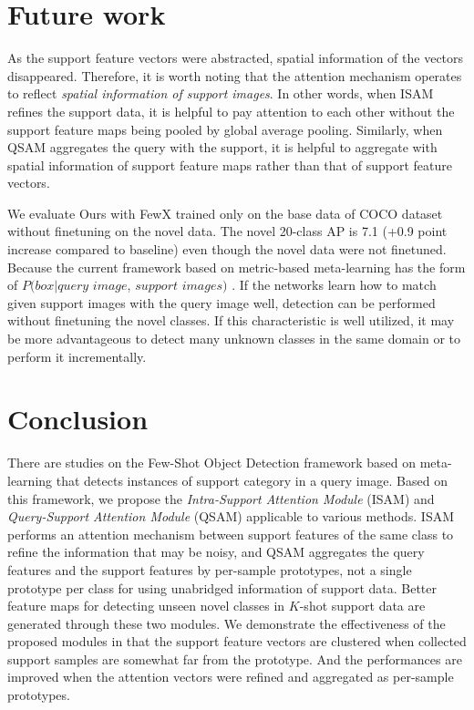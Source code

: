 \documentclass[10pt,twocolumn,letterpaper]{article}
\begin{document}
\section{Future work}
\label{sec:future work}
\quad As the support feature vectors were abstracted, spatial information of the vectors disappeared. Therefore, it is worth noting that the attention mechanism operates to reflect \textit{spatial information of support images}. In other words, when ISAM refines the support data, it is helpful to pay attention to each other without the support feature maps being pooled by global average pooling.
Similarly, when QSAM aggregates the query with the support, it is helpful to aggregate with spatial information of support feature maps rather than that of support feature vectors.

\vspace{+0.15cm}
\quad We evaluate Ours with FewX trained only on the base data of COCO dataset without finetuning on the novel data. The novel 20-class AP is 7.1 (+0.9 point increase compared to baseline) even though the novel data were not finetuned. Because the current framework based on metric-based meta-learning has the form of $P(box | query$ $image$, $support$ $images)$ . If the networks learn how to match given support images with the query image well, detection can be performed without finetuning the novel classes. If this characteristic is well utilized, it may be more advantageous to detect many unknown classes in the same domain or to perform it incrementally.




\section{Conclusion}
\label{sec:conclusion}
There are studies on the Few-Shot Object Detection framework based on meta-learning that detects instances of support category in a query image. Based on this framework, we propose the \textit{Intra-Support Attention Module} (ISAM) and \textit{Query-Support Attention Module} (QSAM) applicable to various methods. ISAM performs an attention mechanism between support features of the same class to refine the information that may be noisy, and QSAM aggregates the query features and the support features by per-sample prototypes, not a single prototype per class for using unabridged information of support data. Better feature maps for detecting unseen novel classes in $K$-shot support data are generated through these two modules. We demonstrate the effectiveness of the proposed modules in that the support feature vectors are clustered when collected support samples are somewhat far from the prototype. And the performances are improved when the attention vectors were refined and aggregated as per-sample prototypes.





\clearpage

{\small


}
\end{document}
